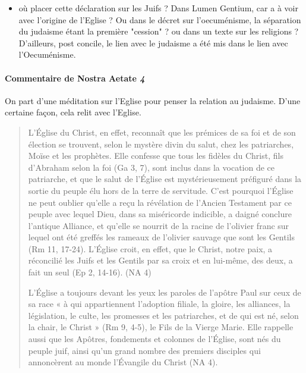 \begin{itemize}
    \item où placer cette déclaration sur les Juifs ? Dans Lumen Gentium, car a à voir avec l'origine de l'Eglise ? Ou dans le décret sur l'oecuménisme, la séparation du judaisme étant la première "cession" ? ou dans un texte sur les religions ? 
    D'ailleurs, post concile, le lien avec le judaisme a été mis dans le lien avec l'Oecuménisme.
     
    \end{itemize}
  
    
    \paragraph{Commentaire de Nostra Aetate \emph{4}} On part d'une méditation sur l'Eglise pour penser la relation au judaisme. D'une certaine façon, cela relit avec l'Eglise.  
    
  \begin{quote}
    L’Église  du  Christ,  en  effet,  reconnaît  que  les  prémices  de  sa  foi  et  de  son  élection  se trouvent,  selon  le  mystère  divin  du  salut,  chez  les  patriarches,  Moïse  et  les  prophètes.  Elle confesse  que  tous  les  fidèles  du  Christ,  fils  d’Abraham  selon  la  foi  (Ga  3,  7),  sont  inclus  dans la  vocation  de  ce  patriarche,  et  que  le  salut  de  l’Église  est  mystérieusement  préfiguré  dans  la sortie  du  peuple  élu  hors  de  la  terre  de  servitude.  C’est  pourquoi  l’Église  ne  peut  oublier qu’elle  a  reçu  la  révélation  de  l’Ancien  Testament  par  ce  peuple  avec  lequel  Dieu,  dans  sa miséricorde  indicible,  a  daigné  conclure  l’antique  Alliance,  et  qu’elle  se  nourrit  de  la  racine de  l’olivier  franc  sur  lequel  ont  été  greffés  les  rameaux  de  l’olivier  sauvage  que  sont  les Gentils  (Rm  11,  17-24).  L’Église  croit,  en  effet,  que  le  Christ,  notre  paix,  a  réconcilié  les  Juifs et  les  Gentils  par sa  croix et  en lui-même, des  deux, a  fait  un seul  (Ep  2, 14-16). (NA  4) 
    
    L’Église  a  toujours  devant  les  yeux  les  paroles  de  l’apôtre  Paul  sur  ceux  de  sa  race  «  à  qui appartiennent  l’adoption  filiale,  la  gloire,  les  alliances,  la  législation,  le  culte,  les  promesses  et les  patriarches,  et  de  qui  est  né,  selon  la  chair,  le  Christ  »  (Rm  9,  4-5),  le  Fils  de  la  Vierge Marie.  Elle  rappelle  aussi  que  les  Apôtres,  fondements  et  colonnes  de  l’Église,  sont  nés  du peuple  juif,  ainsi  qu’un  grand  nombre  des  premiers  disciples  qui  annoncèrent  au  monde l’Évangile  du Christ  (NA  4). 

\end{quote}


